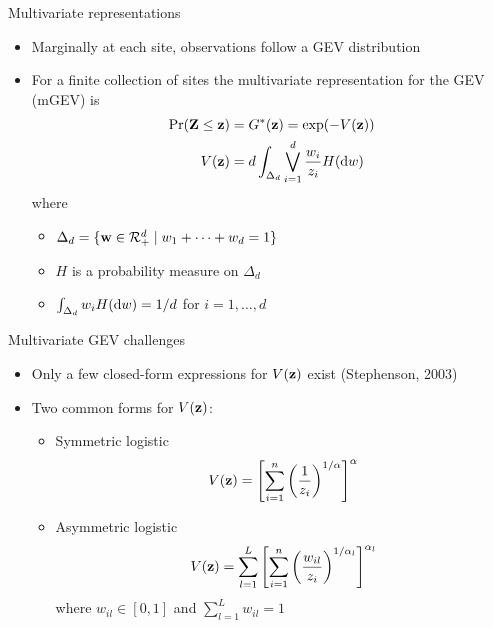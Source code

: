 \documentclass{beamer}
\begin{document}
\begin{frame}{Multivariate representations}
  \begin{itemize} \setlength{\itemsep}{1em}
    \item Marginally at each site, observations follow a GEV distribution
    \item For a finite collection of sites the multivariate representation for the GEV (mGEV) is
    \begin{align*}
      \Pr(\mbox{\bf Z} \le \mbox{\bf z})  &= G^*(\mbox{\bf z}) = \exp(-V(\mbox{\bf z}))\\
            V(\mbox{\bf z})    &= d \int_{\Delta_d} \bigvee_{i = 1}^d \frac{w_i}{z_i} H(\text{d} w)
    \end{align*}
    where
    \begin{itemize} \setlength{\itemsep}{0.25em}
      \item $\Delta_d = \{ \mbox{\bf w} \in {\cal R}^d_+ \mid w_1 + \cdots + w_d = 1\}$
      \item $H$ is a probability measure on $\Delta_d$
      \item $\int_{\Delta_d}w_i H(\text{d} w) = 1 / d$ for $i = 1, \ldots, d$
    \end{itemize}
  \end{itemize}
\end{frame}

\begin{frame}{Multivariate GEV challenges}
  \begin{itemize} \setlength{\itemsep}{1em}
    \item Only a few closed-form expressions for $V(\mbox{\bf z})$ exist (Stephenson, 2003)
    \item Two common forms for $V(\mbox{\bf z})$:
    \begin{itemize}
      \item Symmetric logistic
      \begin{align*}
        V(\mbox{\bf z}) = \left[\sum_{i = 1}^n \left( \frac{ 1 }{ z_i } \right)^{1/\alpha}\right]^\alpha
      \end{align*}
      \item Asymmetric logistic
      \begin{align*}
        V(\mbox{\bf z}) = \sum_{l = 1}^L \left[\sum_{i = 1}^n \left(\frac{w_{il}}{z_i} \right)^{1 / \alpha_l} \right]^{\alpha_l}
      \end{align*}
      where $w_{il} \in [0, 1]$ and $\sum_{l = 1}^L w_{il} = 1$
    \end{itemize}
  \end{itemize}
\end{frame}
\end{document}
